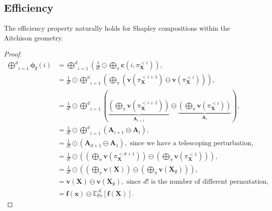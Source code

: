 \documentclass{article}
\theoremstyle{plain}
\theoremstyle{definition}
\theoremstyle{remark}
\begin{document}
\newpage
\subsection{Efficiency}
The efficiency property naturally holds for Shapley compositions within the Aitchison geometry.
\begin{proof}
  \begin{equation}
    \begin{aligned}
      \underset{i=1}{\overset{d}\bigoplus} \bm{\phi}_{\bm{f}}(i) & = \underset{i=1}{\overset{d}\bigoplus}\left( \frac{1}{d!} \odot \underset{\pi}{\bigoplus} \bm{c}(i,\pi_{\bm{X}}^{<i})\right),\\
                                                                 &=  \frac{1}{d!} \odot \underset{i=1}{\overset{d}\bigoplus}\left( \underset{\pi}{\bigoplus} \left( \bm{v}(\pi_{\bm{X}}^{<i+1}) \ominus \bm{v}(\pi_{\bm{X}}^{<i}) \right) \right),\\
                                                                 &=  \frac{1}{d!} \odot \underset{i=1}{\overset{d}\bigoplus}\left( \underbrace{\left(\underset{\pi}{\bigoplus} \bm{v}(\pi_{\bm{X}}^{<i+1}) \right)}_{\bm{A}_{i+1}} \ominus \underbrace{\left( \underset{\pi}{\bigoplus} \bm{v}(\pi_{\bm{X}}^{<i}) \right)}_{\bm{A}_{i}} \right),\\
                                                                 &=  \frac{1}{d!} \odot \underset{i=1}{\overset{d}\bigoplus}\left( \bm{A}_{i+1} \ominus \bm{A}_{i} \right),\\
                                                                 &=  \frac{1}{d!} \odot \left( \bm{A}_{d+1} \ominus \bm{A}_{1} \right), \text{~since we have a telescoping perturbation,}\\
                                                                 &=  \frac{1}{d!} \odot \left( \left( \underset{\pi}{\bigoplus} \bm{v}(\pi_{\bm{X}}^{<d+1}) \right) \ominus \left( \underset{\pi}{\bigoplus} \bm{v}(\pi_{\bm{X}}^{<1}) \right) \right),\\
                                                                 &=  \frac{1}{d!} \odot \left( \left( \underset{\pi}{\bigoplus} \bm{v}(\bm{X}) \right) \ominus \left( \underset{\pi}{\bigoplus} \bm{v}(\bm{X}_{\emptyset}) \right) \right),\\
                                                                 &= \bm{v}(\bm{X}) \ominus \bm{v}(\bm{X}_{\emptyset}), \text{~since $d!$ is the number of different permutation,}\\
                                                                 &= \bm{f}(\bm{x}) \ominus \mathbb{E}^{\mathcal{A}}_{\text{Pr}}[\bm{f}(\bm{X})].
    \end{aligned}
  \end{equation}
\end{proof}
\end{document}
